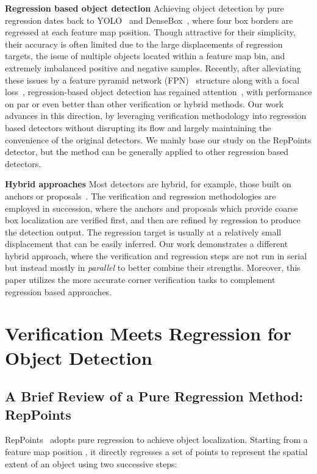\documentclass{article}
\begin{document}
\textbf{Regression based object detection}
Achieving object detection by pure regression dates back to YOLO~\cite{YOLO} and DenseBox~\cite{DenseBox}, where four box borders are regressed at each feature map position. Though attractive for their simplicity, their accuracy is often limited due to the large displacements of regression targets, the issue of multiple objects located within a feature map bin, and extremely imbalanced positive and negative samples. Recently, after alleviating these issues by a feature pyramid network (FPN)~\cite{FPN} structure along with a focal loss~\cite{RetinaNet}, regression-based object detection has regained attention~\cite{tian2019fcos,kong2019foveabox,zhou2019objects,yang19reppts}, with performance on par or even better than other verification or hybrid methods. Our work advances in this direction, by leveraging verification methodology into regression based detectors without disrupting its flow and largely maintaining the convenience of the original detectors. We mainly base our study on the RepPoints detector, but the method can be generally applied to other regression based detectors. 

\textbf{Hybrid approaches} 
Most detectors are hybrid, for example, those built on anchors or proposals~\cite{girshick2014rich,girshick2015fast,ren15faster,RetinaNet,Cascade-rcnn,lu19gridrcnn}. The verification and regression methodologies are employed in succession, where the anchors and proposals which provide coarse box localization are verified first, and then are refined by regression to produce the detection output. The regression target is usually at a relatively small displacement that can be easily inferred. Our work demonstrates a different hybrid approach, where the verification and regression steps are not run in serial but instead mostly in \emph{parallel} to better combine their strengths. Moreover, this paper utilizes the more accurate corner verification tasks to complement regression based approaches.


\section{Verification Meets Regression for Object Detection}

\subsection{A Brief Review of a Pure Regression Method: RepPoints}
\label{sec:review}
RepPoints~\cite{yang19reppts} adopts pure regression to achieve object localization. Starting from a feature map position , it directly regresses a set of points  to represent the spatial extent of an object using two successive steps:
\end{document}
